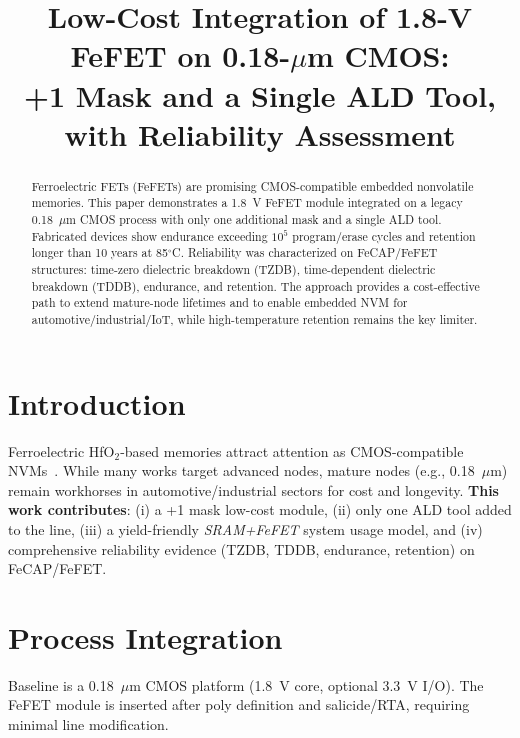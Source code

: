 \documentclass[conference]{IEEEtran}
\begin{document}
\title{Low-Cost Integration of 1.8-V FeFET on 0.18-$\mu$m CMOS:\\
+1 Mask and a Single ALD Tool, with Reliability Assessment}

\author{
}

\maketitle

\begin{abstract}
Ferroelectric FETs (FeFETs) are promising CMOS-compatible embedded nonvolatile memories.
This paper demonstrates a 1.8~V FeFET module integrated on a legacy 0.18~$\mu$m CMOS process with only one additional mask and a single ALD tool.
Fabricated devices show endurance exceeding $10^5$ program/erase cycles and retention longer than 10 years at 85$^\circ$C.
Reliability was characterized on FeCAP/FeFET structures: time-zero dielectric breakdown (TZDB), time-dependent dielectric breakdown (TDDB), endurance, and retention.
The approach provides a cost-effective path to extend mature-node lifetimes and to enable embedded NVM for automotive/industrial/IoT, while high-temperature retention remains the key limiter.
\end{abstract}

\section{Introduction}
Ferroelectric HfO$_2$-based memories attract attention as CMOS-compatible NVMs~\cite{boscke2011,mueller2012,mikolajick2019,mueller2015}.
While many works target advanced nodes, mature nodes (e.g., 0.18~$\mu$m) remain workhorses in automotive/industrial sectors for cost and longevity.
\textbf{This work contributes}: (i) a +1 mask low-cost module, (ii) only one ALD tool added to the line, (iii) a yield-friendly \textit{SRAM+FeFET} system usage model, and (iv) comprehensive reliability evidence (TZDB, TDDB, endurance, retention) on FeCAP/FeFET.

\section{Process Integration}
Baseline is a 0.18~$\mu$m CMOS platform (1.8~V core, optional 3.3~V I/O).
The FeFET module is inserted after poly definition and salicide/RTA, requiring minimal line modification.
\end{document}
